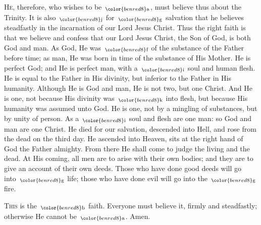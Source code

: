 \documentclass[12pt]{article} %
\newcommand{\madlib}[1]{\uline{\hspace{3em}}$_{\color{benred8}\text{#1}}$}
\begin{document}
\lettrine{H}{e}, therefore, who wishes to be~\madlib{a}, must believe thus about the Trinity. It is also~\madlib{j} for~\madlib{g} salvation that he believes steadfastly in the incarnation of our Lord Jesus Christ. Thus the right faith is that we believe and confess that our Lord Jesus Christ, the Son of God, is both God and man. As God, He was~\madlib{f} of the substance of the Father before time; as man, He was born in time of the substance of His Mother. He is perfect God; and He is perfect man, with a~\madlib{i} soul and human flesh. He is equal to the Father in His divinity, but inferior to the Father in His humanity. Although He is God and man, He is not two, but one Christ. And He is one, not because His divinity was~\madlib{k} into flesh, but because His humanity was assumed unto God. He is one, not by a mingling of substances, but by unity of person. As a~\madlib{i} soul and flesh are one man: so God and man are one Christ. He died for our salvation, descended into Hell, and rose from the dead on the third day. He ascended into Heaven, sits at the right hand of God the Father almighty. From there He shall come to judge the living and the dead. At His coming, all men are to arise with their own bodies; and they are to give an account of their own deeds. Those who have done good deeds will go into~\madlib{g} life; those who have done evil will go into the~\madlib{g} fire. 

\lettrine{T}{his} is the~\madlib{b} faith. Everyone must believe it, firmly and steadfastly; otherwise He cannot be~\madlib{a}. Amen.

\newpage
\end{document}
